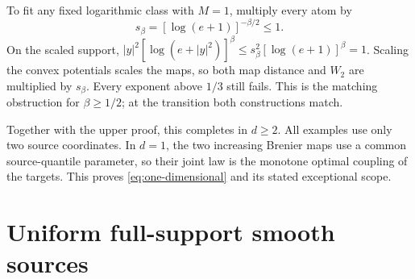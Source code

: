 \documentclass[11pt]{article}
\numberwithin{equation}{section}
\theoremstyle{remark}\newtheorem{remark}[theorem]{Remark}
\begin{document}
To fit any fixed logarithmic class with $M=1$, multiply every atom by
\[
 s_\beta=[\log(e+1)]^{-\beta/2}\le1.
\]
On the scaled support, $|y|^2[\log(e+|y|^2)]^\beta\le s_\beta^2[\log(e+1)]^\beta=1$. Scaling the convex potentials scales the maps, so both map distance and $W_2$ are multiplied by $s_\beta$. Every exponent above $1/3$ still fails. This is the matching obstruction for $\beta\ge1/2$; at the transition both constructions match.

Together with the upper proof, this completes  in $d\ge2$. All examples use only two source coordinates. In $d=1$, the two increasing Brenier maps use a common source-quantile parameter, so their joint law is the monotone optimal coupling of the targets. This proves \eqref{eq:one-dimensional} and its stated exceptional scope.

\section{Uniform full-support smooth sources}\label{sec:smooth}
\end{document}
